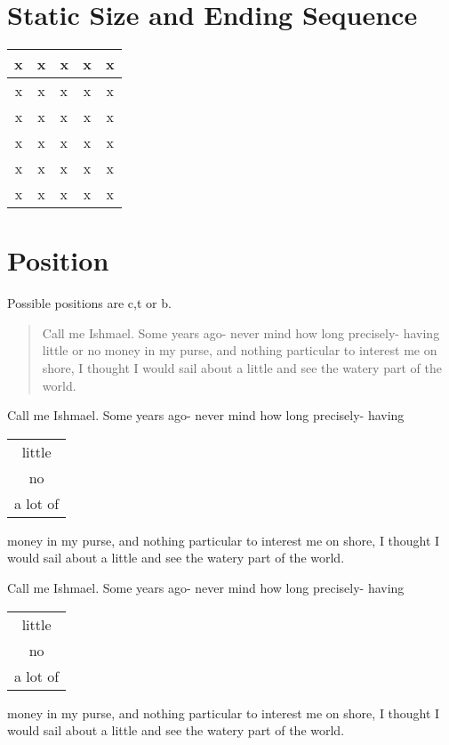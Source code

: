 \documentclass[a4paper,10pt]{scrartcl}
\begin{document}
\section{Static Size and Ending Sequence}
\begin{center}
\begin{tabular}{|c|c|p{7.5 cm}@{end of cell}|c|c|} \hline
x & x & x & x & x \\ \hline
x & x & x & x & x \\ \hline 
x & x & x & x & x \\ \hline
x & x & x & x & x \\ \hline
x & x & x & x & x \\ \hline
x & x & x & x & x \\ \hline
\end{tabular}
\newline
\end{center}


\pagebreak
\section{Position}
Possible positions are c,t or b.
\begin{quote}
Call me Ishmael. Some years ago- never mind how long precisely- having little or no money in my purse, and nothing particular to interest me on shore, I thought I would sail about a little and see the watery part of the world. 
\newline
\end{quote}

Call me Ishmael. Some years ago- never mind how long precisely- having 
\begin{tabular}[c]{|c|}
little \\
no \\
a lot of \\
\end{tabular}
money in my purse, and nothing particular to interest me on shore, I thought I would sail about a little and see the watery part of the world.
\newline

Call me Ishmael. Some years ago- never mind how long precisely- having 
\begin{tabular}[t]{|c|}
little \\
no \\
a lot of \\
\end{tabular}
money in my purse, and nothing particular to interest me on shore, I thought I would sail about a little and see the watery part of the world. 
\newline
\end{document}

